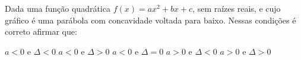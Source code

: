 Dada uma função quadrática $f(x)=ax^2+bx+c$, sem raízes reais, e cujo gráfico é uma parábola com concavidade voltada para baixo. Nessas condições é correto afirmar que:

$a<0$ e $\Delta<0$
$a<0$ e $\Delta>0$
$a<0$ e $\Delta=0$
$a>0$ e $\Delta<0$
$a>0$ e $\Delta>0$



